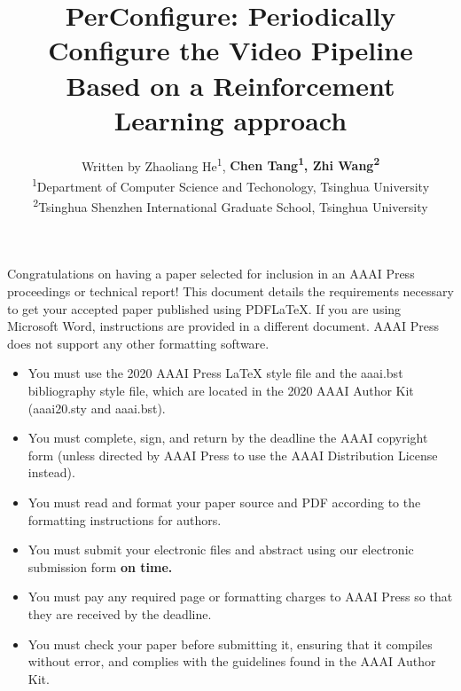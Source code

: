 \documentclass[letterpaper]{article} %
\title{PerConfigure: Periodically Configure the Video Pipeline Based on a Reinforcement Learning approach}
\author{Written by Zhaoliang He\textsuperscript{\rm 1}, \Large \textbf{Chen Tang\textsuperscript{\rm 1}, Zhi Wang\textsuperscript{\rm 2}}\\ %
\textsuperscript{\rm 1}Department of Computer Science and Techonology, Tsinghua University\\  
\textsuperscript{\rm 2}Tsinghua Shenzhen International Graduate School, Tsinghua University}
\begin{document}

\maketitle



\noindent Congratulations on having a paper selected for inclusion in an AAAI Press proceedings or technical report! This document details the requirements necessary to get your accepted paper published using PDF\LaTeX{}. If you are using Microsoft Word, instructions are provided in a different document. AAAI Press does not support any other formatting software. 

\begin{itemize}
\item You must use the 2020 AAAI Press \LaTeX{} style file and the aaai.bst bibliography style file, which are located in the 2020 AAAI Author Kit (aaai20.sty and aaai.bst).
\item You must complete, sign, and return by the deadline the AAAI copyright form (unless directed by AAAI Press to use the AAAI Distribution License instead).
\item You must read and format your paper source and PDF according to the formatting instructions for authors.
\item You must submit your electronic files and abstract using our electronic submission form \textbf{on time.}
\item You must pay any required page or formatting charges to AAAI Press so that they are received by the deadline.
\item You must check your paper before submitting it, ensuring that it compiles without error, and complies with the guidelines found in the AAAI Author Kit.

\end{itemize}





\end{document}
